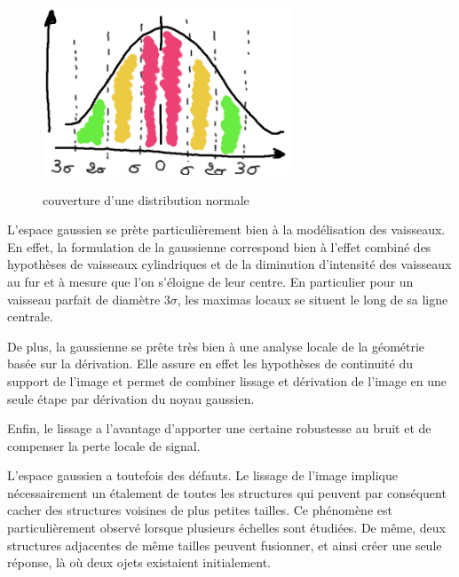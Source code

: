 \begin{figure}
  \centering
  \includegraphics[height=5cm]{Images/normal_distribution_probability_coverage.png}
  \label{fig:normal_distribution_probability_coverage}
  \caption{couverture d'une distribution normale}
\end{figure}

L'espace gaussien se prète particulièrement bien à la modélisation des vaisseaux. En effet, la formulation de la gaussienne correspond bien à l'effet combiné des hypothèses de vaisseaux cylindriques et de la diminution d'intensité des vaisseaux au fur et à mesure que l'on s'éloigne de leur centre. En particulier pour un vaisseau parfait de diamètre $3\sigma$, les maximas locaux se situent le long de sa ligne centrale.

De plus, la gaussienne se prête très bien à une analyse locale de la géométrie basée sur la dérivation. Elle assure en effet les hypothèses de continuité du support de l'image et permet de combiner lissage et dérivation de l'image en une seule étape par dérivation du noyau gaussien.

Enfin, le lissage a l'avantage d'apporter une certaine robustesse au bruit et de compenser la perte locale de signal.

L'espace gaussien a toutefois des défauts. Le lissage de l'image implique nécessairement un étalement de toutes les structures qui peuvent par conséquent cacher des structures voisines de plus petites tailles. Ce phénomène est particulièrement observé lorsque plusieurs échelles sont étudiées. De même, deux structures adjacentes de même tailles peuvent fusionner, et ainsi créer une seule réponse, là où deux ojets existaient initialement.

